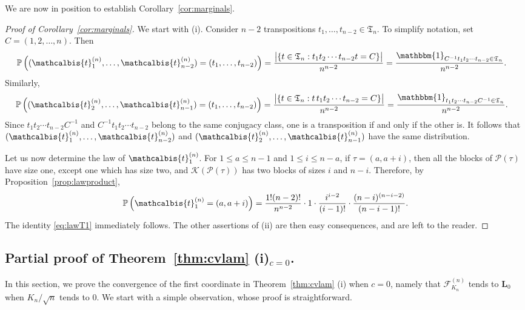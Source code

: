 \documentclass[10pt]{amsart}
\theoremstyle{definition}\newtheorem{defi}[theo]{Definition}\newtheorem{rema}[theo]{Remark}\newtheorem{exam}[theo]{Example}\newtheorem{exem}[theo]{Example}\newtheorem{nota}[theo]{Notation}
\def\PPP{\mathcal P}
\def\FKn{\mathcal{F}^{(n)}_{K_{n}}}
\def\tb{\mathcalbis{t}}
\renewcommand\Pr[1]{\mathbb{P}\left(#1\right)}
\begin{document}
We are now in position to establish Corollary~\ref{cor:marginals}.

\begin{proof}[Proof of Corollary~\ref{cor:marginals}]
We start with (i). Consider $n-2$ transpositions $t_{1}, \ldots,t_{n-2} \in \mathfrak{T}_{n}$. To simplify notation, set $C=(1,2,\ldots,n)$. Then
\[\hspace{-3mm}\Pr{(\tb_{1}^{(n)}, \ldots, \tb_{n-2}^{(n)})=(t_{1}, \ldots,t_{n-2})}= \frac{\big| \{t \in \mathfrak{T}_{n} : t_{1}t_{2} \cdots t_{n-2} t= C\}\big| }{n^{n-2}}= \frac{\mathbbm{1}_{C^{-1} t_{1}t_{2} \cdots t_{n-2} \in \mathfrak{T}_{n}} }{n^{n-2}}.\]
Similarly,
\[\hspace{-3mm}\Pr{(\tb_{2}^{(n)}, \ldots, \tb_{n-1}^{(n)})=(t_{1}, \ldots,t_{n-2})}= \frac{\big| \{t \in \mathfrak{T}_{n} : t \, t_{1}t_{2} \cdots t_{n-2}= C\}\big| }{n^{n-2}}= \frac{\mathbbm{1}_{ t_{1}t_{2} \cdots t_{n-2}  C^{-1}\in \mathfrak{T}_{n}} }{n^{n-2}}.\]
Since $t_{1}t_{2} \cdots t_{n-2}  C^{-1}$ and $ C^{-1} t_{1}t_{2} \cdots t_{n-2}$ belong to the same conjugacy class, one is a transposition if and only if the other is. It follows that $(\tb_{1}^{(n)}, \ldots, \tb_{n-2}^{(n)})$ and $(\tb_{2}^{(n)}, \ldots, \tb^{(n)}_{n-1})$ have the same distribution.

Let us now determine the law of $ \tb_{1}^{(n)}$.   For $1 \leq a  \leq n-1$ and $ 1 \leq i \leq n-a$, if $\tau=(a,a+i)$, then all the blocks of $ \PPP(\tau)$ have size one, except one which has size two, and $ \mathcal{K}( \PPP(\tau))$ has two blocks of sizes $i$ and $n-i$. Therefore, by Proposition~\ref{prop:lawproduct},
\[\Pr{\tb_{1}^{(n)}=(a,a+i)}= \frac{1!(n-2)!}{n^{n-2}} \cdot 1 \cdot \frac{i^{i-2}}{(i-1)!} \cdot \frac{(n-i)^{(n-i-2)}}{(n-i-1)!}.\]
The identity \eqref{eq:lawT1} immediately follows. The other assertions  of (ii) are then easy consequences, and are left to the reader.
\end{proof}

\subsection{Partial proof of Theorem~\ref{thm:cvlam} (i)\texorpdfstring{$_{c=0}$}{c=0}.}
\label{ssec:partialproof}

In this section, we prove the convergence of the first coordinate in Theorem~\ref{thm:cvlam} (i) when $c=0$,
namely that $\FKn$ tends to $\mathbf L_0$ when $K_n/\sqrt{n}$ tends to $0$.
We start with a simple observation, whose proof is straightforward.
\end{document}
